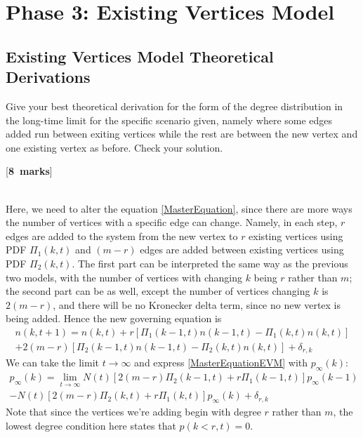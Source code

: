 \documentclass[a4paper,12pt]{article}
\newcounter{nmarks}
\newcommand{\qmarks}[1]{\addtocounter{nmarks}{#1} }
\renewcommand{\qmarks}[1]{\addtocounter{nmarks}{#1} \hspace*{\fill} [\textbf{#1~marks}]}
\begin{document}
\section{Phase 3: Existing Vertices Model}



\subsection{Existing Vertices Model Theoretical Derivations}

Give your best theoretical derivation for the form of the degree distribution in the long-time limit for the specific scenario given, namely where some edges added run between exiting vertices while the rest are between the new vertex and one existing vertex as before. Check your solution. \qmarks{8}

\hfill\\
Here, we need to alter the equation \ref{MasterEquation}, since there are more ways the number of vertices with a specific edge can change. Namely, in each step, $r$ edges are added to the system from the new vertex to $r$ existing vertices using PDF $\Pi_1(k,t)$ and $(m-r)$ edges are added between existing vertices using PDF $\Pi_2(k,t)$. The first part can be interpreted the same way as the previous two models, with the number of vertices with changing $k$ being $r$ rather than $m$; the second part can be as well, except the number of vertices changing $k$ is $2(m-r)$, and there will be no Kronecker delta term, since no new vertex is being added. Hence the new governing equation is
\begin{multline} \label{MasterEquationEVM}
n(k,t+1)= n(k,t)+r\left[\Pi_1(k-1,t)n(k-1,t)-\Pi_1(k,t)n(k,t)\right] \\
+2(m-r)\left[\Pi_2(k-1,t)n(k-1,t)-\Pi_2(k,t)n(k,t)\right]+\delta_{r,k}
\end{multline}
We can take the limit $t\to\infty$ and express \ref{MasterEquationEVM} with $p_\infty(k)$:
\begin{multline} \label{MasterEquationEVMlimit}
p_\infty(k)=\lim_{t\to\infty}N(t)\left[2(m-r)\Pi_2(k-1,t)+r\Pi_1(k-1,t)\right]p_\infty(k-1)\\
-N(t)\left[2(m-r)\Pi_2(k,t)+r\Pi_1(k,t)\right]p_\infty(k)+\delta_{r,k}
\end{multline}
Note that since the vertices we're adding begin with degree $r$ rather than $m$, the lowest degree condition here states that $p(k<r,t)=0$.
\end{document}

